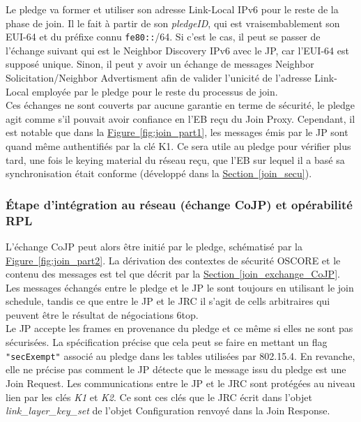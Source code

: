 \documentclass[]{report}
\newcommand{\wordlink}[2]{\hyperref[#2]{#1~\ref{#2}}}
\begin{document}
Le pledge va former et utiliser son adresse Link-Local IPv6 pour le reste de la phase de join. Il le fait à partir de son \textit{pledgeID}, qui est vraisembablement son EUI-64 et du préfixe connu \texttt{fe80::}/64. Si c'est le cas, il peut se passer de l'échange suivant qui est le Neighbor Discovery IPv6 avec le JP, car l'EUI-64 est supposé unique. Sinon, il peut y avoir un échange de messages Neighbor Solicitation/Neighbor Advertisment afin de valider l'unicité de l'adresse Link-Local employée par le pledge pour le reste du processus de join.\\

Ces échanges ne sont couverts par aucune garantie en terme de sécurité, le pledge agit comme s'il pouvait avoir confiance en l'EB reçu du Join Proxy. Cependant, il est notable que dans la \wordlink{Figure}{fig:join_part1}, les messages émis par le JP sont quand même authentifiés par la clé K1. Ce sera utile au pledge pour vérifier plus tard, une fois le keying material du réseau reçu, que l'EB sur lequel il a basé sa synchronisation était conforme (développé dans la \wordlink{Section}{join_secu}). 

\newpage

\subsubsection{Étape d'intégration au réseau (échange CoJP) et opérabilité RPL}
\label{global_CoJP}

L'échange CoJP peut alors être initié par le pledge, schématisé par la \wordlink{Figure}{fig:join_part2}. La dérivation des contextes de sécurité OSCORE et le contenu des messages est tel que décrit par la \wordlink{Section}{join_exchange_CoJP}. Les messages échangés entre le pledge et le JP le sont toujours en utilisant le join schedule, tandis ce que entre le JP et le JRC il s'agit de cells arbitraires qui peuvent être le résultat de négociations 6top.\\

Le JP accepte les frames en provenance du pledge et ce même si elles ne sont pas sécurisées. La spécification \cite{ietf-6tisch-minimal-security-15} précise que cela peut se faire en mettant un flag \texttt{"secExempt"} associé au pledge dans les tables utilisées par 802.15.4. En revanche, elle ne précise pas comment le JP détecte que le message issu du pledge est une Join Request. Les communications entre le JP et le JRC sont protégées au niveau lien par les clés \textit{K1} et \textit{K2}. Ce sont ces clés que le JRC écrit dans l'objet \textit{link\_layer\_key\_set} de l'objet Configuration renvoyé dans la Join Response.
\end{document}

